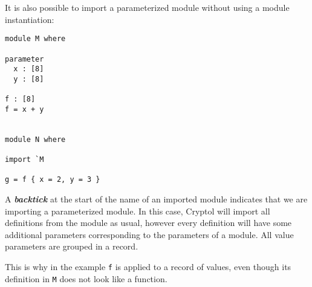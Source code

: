 It is also possible to import a parameterized module without using a
module instantiation:

\begin{verbatim}
module M where

parameter
  x : [8]
  y : [8]

f : [8]
f = x + y


module N where

import `M

g = f { x = 2, y = 3 }
\end{verbatim}

A \textbf{\emph{backtick}} at the start of the name of an imported
module indicates that we are importing a parameterized module. In this
case, Cryptol will import all definitions from the module as usual,
however every definition will have some additional parameters
corresponding to the parameters of a module. All value parameters are
grouped in a record.

This is why in the example \texttt{f} is applied to a record of values,
even though its definition in \texttt{M} does not look like a function.
